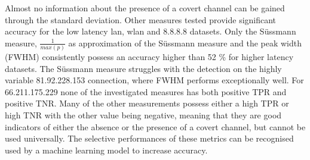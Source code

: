 \documentclass[12pt,a4paper,automark, toc=bib]{scrreprt}
\theoremstyle{definition}
\begin{document}
				Almost no information about the presence of a covert channel can be gained through the standard deviation. Other measures tested provide significant accuracy for the low latency lan, wlan and 8.8.8.8 datasets. Only the Süssmann measure, $\frac{1}{max(p)}$ as approximation of the Süssmann measure and the peak width (FWHM) consistently possess an accuracy higher than 52 \% for higher latency datasets. The Süssmann measure struggles with the detection on the highly variable 81.92.228.153 connection, where FWHM performs exceptionally well. For 66.211.175.229 none of the investigated measures has both positive TPR and positive TNR. Many of the other measurements possess either a high TPR or high TNR with the other value being negative, meaning that they are good indicators of either the absence or the presence of a covert channel, but cannot be used universally. The selective performances of these metrics can be recognised used by a machine learning model to increase accuracy.\\
\end{document}
